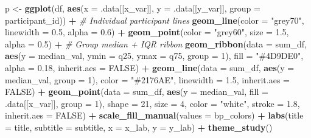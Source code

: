 \documentclass[
]{article}
\newenvironment{Shaded}{\begin{snugshade}}{\end{snugshade}}
\newcommand{\AttributeTok}[1]{\textcolor[rgb]{0.13,0.29,0.53}{#1}}
\newcommand{\CommentTok}[1]{\textcolor[rgb]{0.56,0.35,0.01}{\textit{#1}}}
\newcommand{\ConstantTok}[1]{\textcolor[rgb]{0.56,0.35,0.01}{#1}}
\newcommand{\DecValTok}[1]{\textcolor[rgb]{0.00,0.00,0.81}{#1}}
\newcommand{\FloatTok}[1]{\textcolor[rgb]{0.00,0.00,0.81}{#1}}
\newcommand{\FunctionTok}[1]{\textcolor[rgb]{0.13,0.29,0.53}{\textbf{#1}}}
\newcommand{\NormalTok}[1]{#1}
\newcommand{\OtherTok}[1]{\textcolor[rgb]{0.56,0.35,0.01}{#1}}
\newcommand{\SpecialCharTok}[1]{\textcolor[rgb]{0.81,0.36,0.00}{\textbf{#1}}}
\newcommand{\StringTok}[1]{\textcolor[rgb]{0.31,0.60,0.02}{#1}}
\begin{document}
\begin{Shaded}
\begin{Highlighting}[]
\NormalTok{  p }\OtherTok{\textless{}{-}} \FunctionTok{ggplot}\NormalTok{(df, }\FunctionTok{aes}\NormalTok{(}\AttributeTok{x =}\NormalTok{ .data[[x\_var]], }\AttributeTok{y =}\NormalTok{ .data[[y\_var]],}
                       \AttributeTok{group =}\NormalTok{ participant\_id)) }\SpecialCharTok{+}
    \CommentTok{\# Individual participant lines}
    \FunctionTok{geom\_line}\NormalTok{(}\AttributeTok{color =} \StringTok{"grey70"}\NormalTok{, }\AttributeTok{linewidth =} \FloatTok{0.5}\NormalTok{, }\AttributeTok{alpha =} \FloatTok{0.6}\NormalTok{) }\SpecialCharTok{+}
    \FunctionTok{geom\_point}\NormalTok{(}\AttributeTok{color =} \StringTok{"grey60"}\NormalTok{, }\AttributeTok{size =} \FloatTok{1.5}\NormalTok{, }\AttributeTok{alpha =} \FloatTok{0.5}\NormalTok{) }\SpecialCharTok{+}
    \CommentTok{\# Group median + IQR ribbon}
    \FunctionTok{geom\_ribbon}\NormalTok{(}\AttributeTok{data =}\NormalTok{ sum\_df,}
                \FunctionTok{aes}\NormalTok{(}\AttributeTok{y =}\NormalTok{ median\_val, }\AttributeTok{ymin =}\NormalTok{ q25, }\AttributeTok{ymax =}\NormalTok{ q75, }\AttributeTok{group =} \DecValTok{1}\NormalTok{),}
                \AttributeTok{fill =} \StringTok{"\#4D9DE0"}\NormalTok{, }\AttributeTok{alpha =} \FloatTok{0.18}\NormalTok{, }\AttributeTok{inherit.aes =} \ConstantTok{FALSE}\NormalTok{) }\SpecialCharTok{+}
    \FunctionTok{geom\_line}\NormalTok{(}\AttributeTok{data =}\NormalTok{ sum\_df,}
              \FunctionTok{aes}\NormalTok{(}\AttributeTok{y =}\NormalTok{ median\_val, }\AttributeTok{group =} \DecValTok{1}\NormalTok{),}
              \AttributeTok{color =} \StringTok{"\#2176AE"}\NormalTok{, }\AttributeTok{linewidth =} \FloatTok{1.5}\NormalTok{, }\AttributeTok{inherit.aes =} \ConstantTok{FALSE}\NormalTok{) }\SpecialCharTok{+}
    \FunctionTok{geom\_point}\NormalTok{(}\AttributeTok{data =}\NormalTok{ sum\_df,}
               \FunctionTok{aes}\NormalTok{(}\AttributeTok{y =}\NormalTok{ median\_val, }\AttributeTok{fill =}\NormalTok{ .data[[x\_var]], }\AttributeTok{group =} \DecValTok{1}\NormalTok{),}
               \AttributeTok{shape =} \DecValTok{21}\NormalTok{, }\AttributeTok{size =} \DecValTok{4}\NormalTok{, }\AttributeTok{color =} \StringTok{"white"}\NormalTok{, }\AttributeTok{stroke =} \FloatTok{1.8}\NormalTok{,}
               \AttributeTok{inherit.aes =} \ConstantTok{FALSE}\NormalTok{) }\SpecialCharTok{+}
    \FunctionTok{scale\_fill\_manual}\NormalTok{(}\AttributeTok{values =}\NormalTok{ bp\_colors) }\SpecialCharTok{+}
    \FunctionTok{labs}\NormalTok{(}\AttributeTok{title =}\NormalTok{ title, }\AttributeTok{subtitle =}\NormalTok{ subtitle, }\AttributeTok{x =}\NormalTok{ x\_lab, }\AttributeTok{y =}\NormalTok{ y\_lab) }\SpecialCharTok{+}
    \FunctionTok{theme\_study}\NormalTok{()}


\end{Highlighting}
\end{Shaded}
\end{document}
